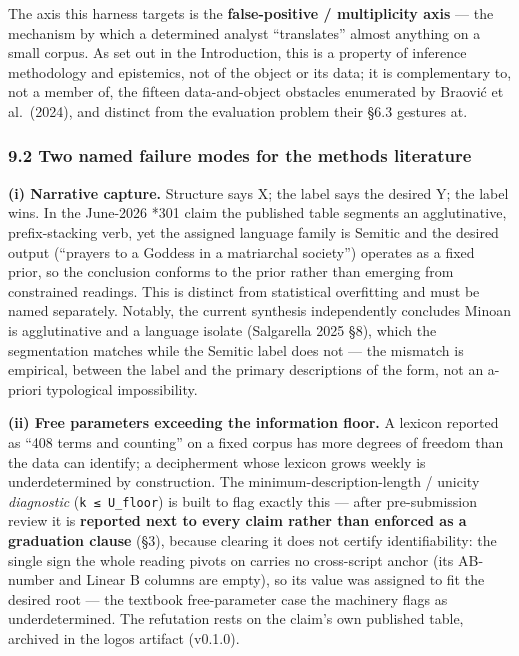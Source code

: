 \documentclass[
  10pt,
]{article}
\begin{document}
The axis this harness targets is the \textbf{false-positive /
multiplicity axis} --- the mechanism by which a determined analyst
``translates'' almost anything on a small corpus. As set out in the
Introduction, this is a property of inference methodology and
epistemics, not of the object or its data; it is complementary to, not a
member of, the fifteen data-and-object obstacles enumerated by Braović
et al.~(2024), and distinct from the evaluation problem their §6.3
gestures at.

\hypertarget{two-named-failure-modes-for-the-methods-literature}{%
\subsubsection{9.2 Two named failure modes for the methods
literature}\label{two-named-failure-modes-for-the-methods-literature}}

\textbf{(i) Narrative capture.} Structure says X; the label says the
desired Y; the label wins. In the June-2026 *301 claim the published
table segments an agglutinative, prefix-stacking verb, yet the assigned
language family is Semitic and the desired output (``prayers to a
Goddess in a matriarchal society'') operates as a fixed prior, so the
conclusion conforms to the prior rather than emerging from constrained
readings. This is distinct from statistical overfitting and must be
named separately. Notably, the current synthesis independently concludes
Minoan is agglutinative and a language isolate (Salgarella 2025 §8),
which the segmentation matches while the Semitic label does not --- the
mismatch is empirical, between the label and the primary descriptions of
the form, not an a-priori typological impossibility.

\textbf{(ii) Free parameters exceeding the information floor.} A lexicon
reported as ``408 terms and counting'' on a fixed corpus has more
degrees of freedom than the data can identify; a decipherment whose
lexicon grows weekly is underdetermined by construction. The
minimum-description-length / unicity \emph{diagnostic}
(\texttt{k\ ≤\ U\_floor}) is built to flag exactly this --- after
pre-submission review it is \textbf{reported next to every claim rather
than enforced as a graduation clause} (§3), because clearing it does not
certify identifiability: the single sign the whole reading pivots on
carries no cross-script anchor (its AB-number and Linear B columns are
empty), so its value was assigned to fit the desired root --- the
textbook free-parameter case the machinery flags as underdetermined. The
refutation rests on the claim's own published table, archived in the
logos artifact (v0.1.0).
\end{document}
